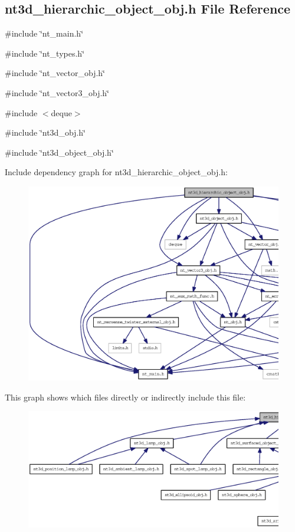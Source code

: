 \subsection{nt3d\_\-hierarchic\_\-object\_\-obj.h File Reference}
\label{nt3d__hierarchic__object__obj_8h}
{\ttfamily \#include \char`\"{}nt\_\-main.h\char`\"{}}\par
{\ttfamily \#include \char`\"{}nt\_\-types.h\char`\"{}}\par
{\ttfamily \#include \char`\"{}nt\_\-vector\_\-obj.h\char`\"{}}\par
{\ttfamily \#include \char`\"{}nt\_\-vector3\_\-obj.h\char`\"{}}\par
{\ttfamily \#include $<$deque$>$}\par
{\ttfamily \#include \char`\"{}nt3d\_\-obj.h\char`\"{}}\par
{\ttfamily \#include \char`\"{}nt3d\_\-object\_\-obj.h\char`\"{}}\par
Include dependency graph for nt3d\_\-hierarchic\_\-object\_\-obj.h:
\nopagebreak
\begin{figure}[H]
\begin{center}
\leavevmode
\includegraphics[width=400pt]{nt3d__hierarchic__object__obj_8h__incl}
\end{center}
\end{figure}
This graph shows which files directly or indirectly include this file:
\nopagebreak
\begin{figure}[H]
\begin{center}
\leavevmode
\includegraphics[width=400pt]{nt3d__hierarchic__object__obj_8h__dep__incl}
\end{center}
\end{figure}
